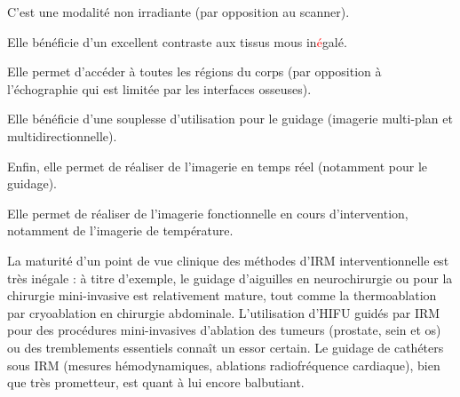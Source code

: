 \begin{description}
    \item C’est une modalité non irradiante (par opposition au scanner).
    \item Elle bénéficie d’un excellent contraste aux tissus mous in\textcolor{red}{é}galé.
    \item Elle permet d’accéder à toutes les régions du corps (par opposition à l’échographie qui est limitée par les interfaces osseuses).
    \item Elle bénéficie d’une souplesse d’utilisation pour le guidage (imagerie multi-plan et multidirectionnelle).
    \item Enfin, elle permet de réaliser de l’imagerie en temps réel (notamment pour le guidage).
    \item Elle permet de réaliser de l’imagerie fonctionnelle en cours d’intervention, notamment de l’imagerie de température.
\end{description}

La maturité d’un point de vue clinique des méthodes d’IRM interventionnelle est très inégale : à titre d’exemple, le guidage d’aiguilles en neurochirurgie ou pour la chirurgie mini-invasive est relativement mature, tout comme la thermoablation par cryoablation en chirurgie abdominale. L’utilisation d’HIFU guidés par IRM pour des procédures mini-invasives d’ablation des tumeurs (prostate, sein et os) ou des tremblements essentiels connaît un essor certain. Le guidage de cathéters sous IRM (mesures hémodynamiques, ablations radiofréquence cardiaque), bien que très prometteur, est quant à lui encore balbutiant.\\